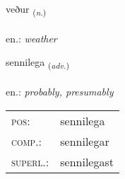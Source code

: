 \documentclass[frontgrid, backgrid]{flacards}\usepackage[]{graphicx}\usepackage[]{xcolor}
\begin{document}
\renewcommand{\flhead}{\vskip5pt \fboxsep=0pt {\small\bfseries\footnotesize Nafnorð | Noun}}
\renewcommand{\fcfoot}{\vskip5pt \fboxsep=0pt \hspace{2pt}{\small\bfseries\footnotesize 1K}}

\renewcommand{\blhead}{\vskip5pt {\small\bfseries\footnotesize Nafnorð | Noun }}
\renewcommand{\bcfoot}{\vskip5pt \hspace{2pt}{\small\bfseries\footnotesize 1K}}


{veður \small{\textsubscript{(\textit{n.})}} \\[1ex] %
\textphonetic{[vɛːðʏr]} \\
en.: \emph{weather} \\  [2ex]
\renewcommand*{\arraystretch}{0.8}
}

\renewcommand{\flhead}{\vskip5pt \fboxsep=0pt {\small\bfseries\footnotesize Atviksorð | Adverb}}
\renewcommand{\fcfoot}{\vskip5pt \fboxsep=0pt \hspace{2pt}{\small\bfseries\footnotesize 1K}}

\renewcommand{\blhead}{\vskip5pt {\small\bfseries\footnotesize Atviksorð | Adverb }}
\renewcommand{\bcfoot}{\vskip5pt \hspace{2pt}{\small\bfseries\footnotesize 1K}}


{sennilega \small{\textsubscript{(\textit{adv.})}} \\[1ex] %
\textphonetic{[sɛnɪlɛɣa]} \\
en.: \emph{probably, presumably} \\  [2ex]
\renewcommand*{\arraystretch}{0.8}
\begin{tabular}{ll}
\textsc{pos}: & sennilega \\ 
\textsc{comp.}: & sennilegar \\ 
\textsc{superl.}: & sennilegast \\
\end{tabular}
}
\end{document}
